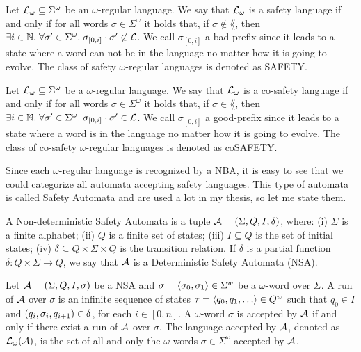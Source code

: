 \begin{definition}
Let $\mathcal{L}{}_\omega{} \subseteq \Sigma^\omega$ be an $\omega$-regular language. We say that $\mathcal{L}{}_\omega{}$ is a safety language if and only if for all words $\sigma \in \Sigma^\omega$ it holds that, if $\sigma \not\in \lang{}$, then $\exists i \in \mathbb{N} .\; \forall \sigma' \in \Sigma^\omega .\; \sigma_{[0,i]} \cdot \sigma' \not\in \mathcal{L}{}$. We call $\sigma_{[0,i]}$ a bad-prefix since it leads to a state where a word can not be in the language no matter how it is going to evolve.
The class of safety $\omega$-regular languages is denoted as SAFETY.
\end{definition}

\begin{definition}
Let $\mathcal{L}{}_\omega{} \subseteq \Sigma^\omega$ be a $\omega$-regular language. We say that $\mathcal{L}{}_\omega{}$ is a co-safety language if and only if for all words $\sigma \in \Sigma^\omega$ it holds that, if $\sigma \in \lang{}$, then $\exists i \in \mathbb{N} .\; \forall \sigma' \in \Sigma^\omega .\; \sigma_{[0,i]} \cdot \sigma' \in \mathcal{L}{}$. We call $\sigma_{[0,i]}$ a good-prefix since it leads to a state where a word is in the language no matter how it is going to evolve.
The class of co-safety $\omega$-regular languages is denoted as coSAFETY.
\end{definition}

Since each $\omega$-regular language is recognized by a NBA, it is easy to see that we could categorize all automata accepting safety languages. This type of automata is called Safety Automata and are used a lot in my thesis, so let me state them.

\begin{definition}
A Non-deterministic Safety Automata is a tuple $\mathcal{A} = \left( \Sigma,Q,I,\delta \right)$, where: (i) $\Sigma$ is a finite alphabet; (ii) $Q$ is a finite set of states; (iii) $I \subseteq Q$ is the set of initial states; (iv) $\delta \subseteq Q \times \Sigma \times Q$ is the transition relation.
If $\delta$ is a partial function $\delta \colon Q \times \Sigma \to Q$, we say that $\mathcal{A}$ is a Deterministic Safety Automata (NSA). 
\end{definition}

\begin{definition}
Let $\mathcal{A} = \left( \Sigma,Q,I,\sigma \right)$ be a NSA and $\sigma = \left\langle \sigma_0,\sigma_1 \right\rangle \in \Sigma^{w}$ be a $\omega$-word over $\Sigma$.
A run of $\mathcal{A}$ over $\sigma$ is an infinite sequence of states $\tau = \sequence{q_0,q_1,\dots} \in Q^w$ such that $q_0 \in I$ and $\left( q_i,\sigma_i,q_{i+1} \right) \in \delta$, for each $i \in [0,n]$.
A $\omega$-word $\sigma$ is accepted by $\mathcal{A}$ if and only if there exist a run of $\mathcal{A}$ over $\sigma$. 
The language accepted by $\mathcal{A}$, denoted as $\mathcal{L}{}_\omega{(\mathcal{A})}$, is the set of all and only the $\omega$-words $\sigma \in \Sigma^\omega$ accepted by $\mathcal{A}$.
\end{definition}

